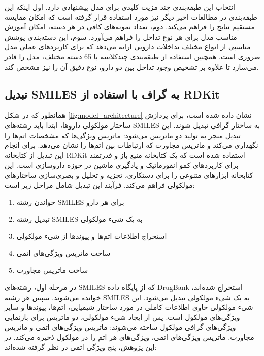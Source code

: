 انتخاب این طبقه‌بندی چند مزیت کلیدی برای مدل پیشنهادی دارد. اول اینکه این طبقه‌بندی در مطالعات اخیر دیگر نیز مورد استفاده قرار گرفته است \cite{ref_deng2020, ref_asfand2024} که امکان مقایسه مستقیم نتایج را فراهم می‌کند. دوم، تعداد نمونه‌های کافی در هر دسته، امکان آموزش مناسب مدل برای هر نوع تداخل را فراهم می‌آورد. سوم، این دسته‌بندی پوشش مناسبی از انواع مختلف تداخلات دارویی ارائه می‌دهد که برای کاربردهای عملی مدل ضروری است. همچنین استفاده از طبقه‌بندی چندکلاسه با 65 دسته مختلف، مدل را قادر می‌سازد تا علاوه بر تشخیص وجود تداخل بین دو دارو، نوع دقیق آن را نیز مشخص کند.

\subsection{تبدیل SMILES به گراف با استفاده از RDKit}

همانطور که در شکل \ref{fig:model_architecture} نشان داده شده است، برای پردازش ساختار مولکولی داروها، ابتدا باید رشته‌های SMILES به ساختار گرافی تبدیل شوند. این تبدیل منجر به تولید دو ماتریس می‌شود: ماتریس ویژگی‌ها که مشخصات اتم‌ها را نگهداری می‌کند و ماتریس مجاورت که ارتباطات بین اتم‌ها را نشان می‌دهد. برای انجام این تبدیل از کتابخانه RDKit \cite{ref_rdkit} استفاده شده است که یک کتابخانه منبع باز و قدرتمند برای کاربردهای کمو-انفورماتیک و یادگیری ماشین در حوزه داروسازی است. این کتابخانه ابزارهای متنوعی را برای دستکاری، تجزیه و تحلیل و بصری‌سازی ساختارهای مولکولی فراهم می‌کند. فرآیند این تبدیل شامل مراحل زیر است:

\begin{enumerate}
	\item خواندن رشته SMILES برای هر دارو
	\item تبدیل رشته SMILES به یک شیء مولکولی
	\item استخراج اطلاعات اتم‌ها و پیوندها از شیء مولکولی
	\item ساخت ماتریس ویژگی‌های اتمی
	\item ساخت ماتریس مجاورت
\end{enumerate}

در مرحله اول، رشته‌های SMILES که از پایگاه داده DrugBank استخراج شده‌اند، خوانده می‌شوند. سپس هر رشته SMILES به یک شیء مولکولی تبدیل می‌شود. این شیء مولکولی حاوی اطلاعات کاملی در مورد ساختار شیمیایی، اتم‌ها، پیوندها و سایر ویژگی‌های مولکول است. پس از ایجاد شیء مولکولی، دو ماتریس برای بازنمایی ویژگی‌های گرافی مولکول ساخته می‌شوند: ماتریس ویژگی‌های اتمی و ماتریس مجاورت. ماتریس ویژگی‌های اتمی، ویژگی‌های هر اتم را در مولکول ذخیره می‌کند. در این پژوهش، پنج ویژگی اتمی در نظر گرفته شده‌اند:

